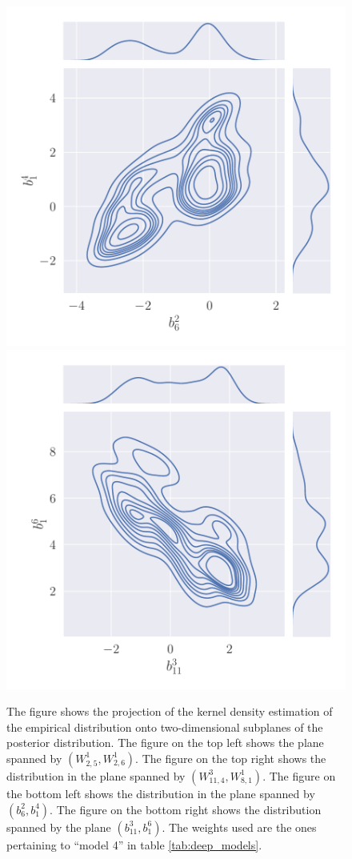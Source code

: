 \begin{figure}[H]
    \includegraphics[scale=0.4]{figures/posterior_distribution/posterior_weights_2.pdf}
    \includegraphics[scale=0.4]{figures/posterior_distribution/posterior_weights_3.pdf}
    \caption{The figure shows the projection of the kernel density estimation of the empirical distribution onto two-dimensional subplanes of the posterior distribution. The figure on the top left shows the plane spanned by $(W_{2,5}^1, W_{2,6}^1)$. The figure on the top right shows the distribution in the plane spanned by $(W_{11,4}^3, W_{8,1}^1)$. The figure on the bottom left shows the distribution in the plane spanned by $(b_6^2, b_1^4)$. The figure on the bottom right shows the distribution spanned by the plane $(b_{11}^3, b_1^6)$. The weights used are the ones pertaining to ``model 4'' in table \ref{tab:deep_models}.
    }
    \label{fig:posterior_weights}
\end{figure}
